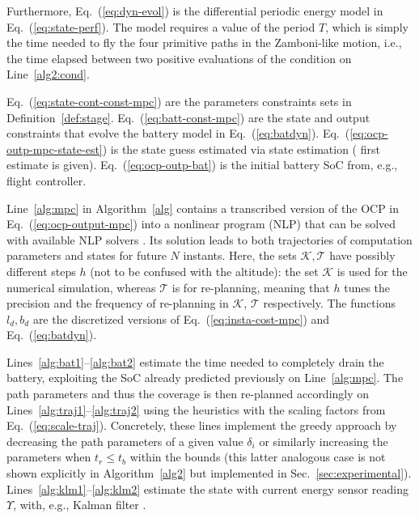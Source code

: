 \documentclass[letterpaper,10pt,journal,twoside]{IEEEtran}
\theoremstyle{definition}
\begin{document}
Furthermore, Eq.~(\ref{eq:dyn-evol}) is the differential periodic energy model in Eq.~(\ref{eq:state-perf}). The model requires a value of the period $T$, which is simply the time needed to fly the four primitive paths in the Zamboni-like motion, i.e., the time elapsed between two positive evaluations of the condition on Line~\ref{alg2:cond}.

Eq.~(\ref{eq:state-cont-const-mpc}) are the parameters constraints sets in Definition~\ref{def:stage}. Eq.~(\ref{eq:batt-const-mpc}) are the state and output constraints %
that evolve the battery model in Eq.~(\ref{eq:batdyn}). Eq.~(\ref{eq:ocp-outp-mpc-state-est}) is the state guess estimated via state estimation %
(%
first estimate is given). Eq.~(\ref{eq:ocp-outp-bat}) is the initial battery SoC from, e.g., flight controller.

Line~\ref{alg:mpc} in Algorithm~\ref{alg} contains a transcribed version of the OCP in Eq.~(\ref{eq:ocp-output-mpc}) into a nonlinear program (NLP) that can be %
solved with available NLP solvers%
. Its solution leads to both trajectories of {\color{blue} computation} parameters and states for future $N$ instants. Here, the sets $\mathcal{K},\mathcal{T}$ have possibly different steps $h$ (not to be confused with the altitude){\color{blue}: 
the set $\mathcal{K}$ is used for the numerical simulation, whereas $\mathcal{T}$ is for re-planning, meaning that $h$ tunes the precision and the frequency of re-planning in $\mathcal{K}$, $\mathcal{T}$ respectively.}
The functions $l_d,b_d$ are the discretized versions of Eq.~(\ref{eq:insta-cost-mpc}) and Eq.~(\ref{eq:batdyn}).%

Lines~\ref{alg:bat1}--\ref{alg:bat2} estimate the time needed to completely drain the battery, exploiting the SoC already predicted previously on Line~\ref{alg:mpc}. The {\color{blue}path parameters and thus the} coverage is then re{\color{blue}-}planned accordingly on Lines~\ref{alg:traj1}--\ref{alg:traj2} using {\color{blue} the heuristics with the} %
scaling factors from Eq.~(\ref{eq:scale-traj}). 
{\color{blue} Concretely, these lines implement the greedy approach by decreasing the path parameters of a given value $\delta_i$ or similarly increasing the parameters when $t_r\leq t_b$ within the bounds (this latter analogous case is not shown explicitly in Algorithm~\ref{alg2} but implemented in Sec.~\ref{sec:experimental})}.
Lines~\ref{alg:klm1}--\ref{alg:klm2} estimate the %
state with current energy sensor reading $\Upsilon$, with, e.g., %
Kalman filter%
.
\end{document}
